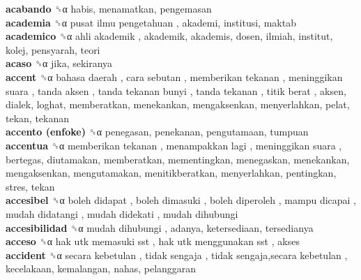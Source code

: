 \textbf{acabando} ␝α  habis, menamatkan, pengemasan  \\
\textbf{academia} ␝α   pusat ilmu pengetahuan , akademi, institusi, maktab  \\
\textbf{academico} ␝α   ahli akademik , akademik, akademis, dosen, ilmiah, institut, kolej, pensyarah, teori  \\
\textbf{acaso} ␝α  jika, sekiranya  \\
\textbf{accent} ␝α   bahasa daerah ,  cara sebutan ,  memberikan tekanan ,  meninggikan suara ,  tanda aksen ,  tanda tekanan bunyi ,  tanda tekanan ,  titik berat , aksen, dialek, loghat, memberatkan, menekankan, mengaksenkan, menyerlahkan, pelat, tekan, tekanan  \\
\textbf{accento (enfoke)} ␝α  penegasan, penekanan, pengutamaan, tumpuan  \\
\textbf{accentua} ␝α   memberikan tekanan ,  menampakkan lagi ,  meninggikan suara , bertegas, diutamakan, memberatkan, mementingkan, menegaskan, menekankan, mengaksenkan, mengutamakan, menitikberatkan, menyerlahkan, pentingkan, stres, tekan  \\
\textbf{accesibel} ␝α   boleh didapat ,  boleh dimasuki ,  boleh diperoleh ,  mampu dicapai ,  mudah didatangi ,  mudah didekati ,  mudah dihubungi   \\
\textbf{accesibilidad} ␝α   mudah dihubungi , adanya, ketersediaan, tersedianya  \\
\textbf{acceso} ␝α   hak utk memasuki sst ,  hak utk menggunakan sst , akses  \\
\textbf{accident} ␝α   secara kebetulan ,  tidak sengaja ,  tidak sengaja,secara kebetulan , kecelakaan, kemalangan, nahas, pelanggaran  \\

